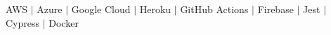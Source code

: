 AWS $|$ Azure $|$ Google Cloud $|$ Heroku 
$|$ GitHub Actions $|$ Firebase 
$|$ Jest $|$ Cypress $|$ Docker 